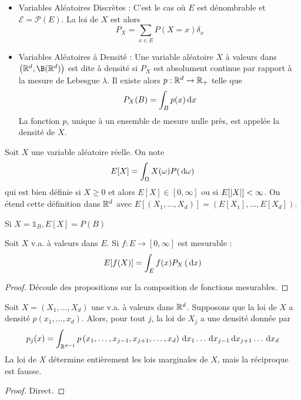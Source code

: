 \documentclass{cours}
\begin{document}
    \begin{definition}
        \begin{itemize}
            \item Variables Aléatoires Discrètes : C'est le cas où $E$ est dénombrable et $\mathcal{E} = \mathcal{P}(E)$. La loi de $X$ est alors \[P_{X} = \sum_{x \in E}P(X = x)\delta_{x}\]
            \item Variables Aléatoires à Densité : Une variable aléatoire $X$ à valeurs dans $\left(\R^{d}, \B(\R^{d})\right)$ est dite à densité si $P_{X}$ est absolument continue par rapport à la mesure de Lebesgue $\lambda$. Il existe alors $p : \mathbb{R}^{d} \rightarrow \mathbb{R}_{+}$ telle que \[P_{X}(B) = \int_{B}p(x){\rm \, d} x\] La fonction $p$, unique à un ensemble de mesure nulle près, est appelée la densité de $X$.
        \end{itemize}
    \end{definition}

    \begin{definition}
        Soit $X$ une variable aléatoire réelle. On note \[E[X] = \int_{\Omega}X(\omega)P({\rm \, d} \omega)\]
        qui est bien définie si $X \geq 0$ et alors $E[X] \in \left[0, \infty\right]$ ou si $E[\left|X\right|] < \infty$. On étend cette définition dans $\mathbb{R}^{d}$ avec $E\left[\left(X_{1}, \ldots, X_{d}\right)\right] = \left(E[X_{1}], \ldots, E[X_{d}]\right)$.
    \end{definition}

    \begin{proposition}
        Si $X = \mathds{1}_{B}, E[X] = P(B)$ 
    \end{proposition}

    \begin{proposition}
        Soit $X$ v.a. à valeurs dans $E$. Si $f : E \rightarrow \left[0, \infty\right]$ est mesurable : 
        \[
            E[f(X)] = \int_{E} f(x)P_{X}\left({\rm \, d} x\right)
        \]
    \end{proposition}
    \begin{proof}
        Découle des propositions sur la composition de fonctions mesurables.
    \end{proof}

    \begin{proposition}
        Soit $X = \left(X_{1}, \ldots, X_{d}\right)$ une v.a. à valeurs dans $\mathbb{R}^{d}$. Supposons que la loi de $X$ a densité $p\left(x_{1}, \ldots, x_{d}\right)$. Alors, pour tout $j$, la loi de $X_{j}$ a une densité donnée par 
        \[
            p_{j}(x) = \int_{\mathbb{R}^{d - 1}} p\left(x_{1}, \ldots, x_{j - 1}, x_{j + 1}, \ldots, x_{d}\right){\rm \, d} x_{1} \ldots {\rm \, d} x_{j - 1} {\rm \, d} x_{j + 1}\ldots {\rm \, d} x_{d}
        \]
        La loi de $X$ détermine entièrement les lois marginales de $X$, mais la réciproque est fausse. 
    \end{proposition}
    \begin{proof}
        Direct.
    \end{proof}
\end{document}
